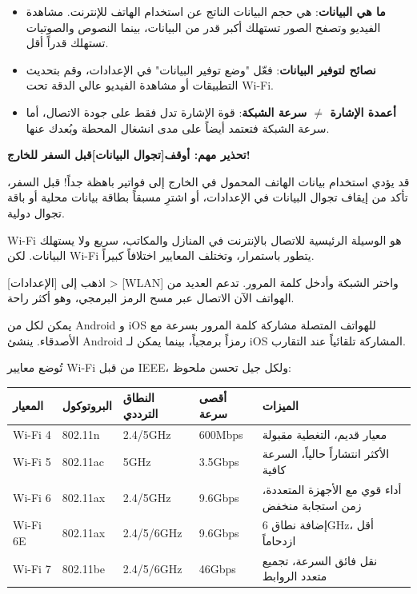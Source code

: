 
\begin{itemize}
  \item \textbf{ما هي البيانات}: هي حجم البيانات الناتج عن استخدام الهاتف للإنترنت. مشاهدة الفيديو وتصفح الصور تستهلك أكبر قدر من البيانات، بينما النصوص والصوتيات تستهلك قدراً أقل.
  \item \textbf{نصائح لتوفير البيانات}: فعّل "وضع توفير البيانات" في الإعدادات، وقم بتحديث التطبيقات أو مشاهدة الفيديو عالي الدقة تحت Wi-Fi.
  \item \textbf{أعمدة الإشارة $\neq$ سرعة الشبكة}: قوة الإشارة تدل فقط على جودة الاتصال، أما سرعة الشبكة فتعتمد أيضاً على مدى انشغال المحطة وبُعدك عنها.
\end{itemize}

\textbf{تحذير مهم: أوقف[تجوال البيانات]قبل السفر للخارج!}\par

قد يؤدي استخدام بيانات الهاتف المحمول في الخارج إلى فواتير باهظة جداً! قبل السفر، تأكد من إيقاف تجوال البيانات في الإعدادات، أو اشترِ مسبقاً بطاقة بيانات محلية أو باقة تجوال دولية.


Wi-Fi هو الوسيلة الرئيسية للاتصال بالإنترنت في المنازل والمكاتب، سريع ولا يستهلك البيانات. لكن Wi-Fi يتطور باستمرار، وتختلف المعايير اختلافاً كبيراً.


اذهب إلى [الإعدادات] > [WLAN] واختر الشبكة وأدخل كلمة المرور. تدعم العديد من الهواتف الآن الاتصال عبر مسح الرمز البرمجي، وهو أكثر راحة.


يمكن لكل من Android و iOS للهواتف المتصلة مشاركة كلمة المرور بسرعة مع الأصدقاء. ينشئ Android رمزاً برمجياً، بينما يمكن لـ iOS المشاركة تلقائياً عند التقارب.


تُوضع معايير Wi-Fi من قبل IEEE، ولكل جيل تحسن ملحوظ:

\begin{center}
\begin{tabularx}{\linewidth}{|X|X|X|X|X|}
\hline
\textbf{المعيار} & \textbf{البروتوكول} & \textbf{النطاق الترددي} & \textbf{أقصى سرعة} & \textbf{الميزات} \tabularnewline
\hline
Wi-Fi 4 & 802.11n & 2.4/5GHz & 600Mbps & معيار قديم، التغطية مقبولة \tabularnewline
Wi-Fi 5 & 802.11ac & 5GHz & 3.5Gbps & الأكثر انتشاراً حالياً، السرعة كافية \tabularnewline
Wi-Fi 6 & 802.11ax & 2.4/5GHz & 9.6Gbps & أداء قوي مع الأجهزة المتعددة، زمن استجابة منخفض \tabularnewline
Wi-Fi 6E & 802.11ax & 2.4/5/6GHz & 9.6Gbps & إضافة نطاق 6GHz، أقل ازدحاماً \tabularnewline
Wi-Fi 7 & 802.11be & 2.4/5/6GHz & 46Gbps & نقل فائق السرعة، تجميع متعدد الروابط \tabularnewline
\hline
\end{tabularx}
\end{center}

